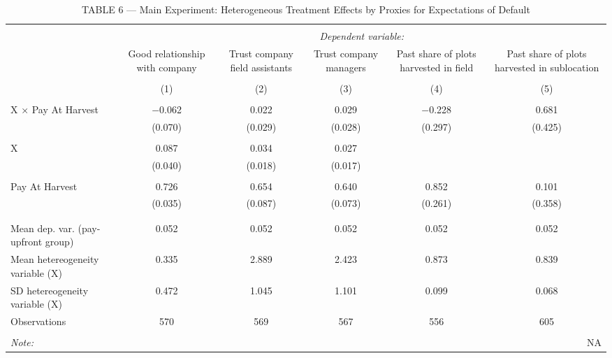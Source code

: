 
\begin{table}[!htbp] \centering 
  \caption{TABLE 6 — Main Experiment: Heterogeneous Treatment Effects by Proxies for Expectations of Default} 
  \label{} 
\begin{tabular}{@{\extracolsep{5pt}}lccccc} 
\\[-1.8ex]\hline 
\hline \\[-1.8ex] 
 & \multicolumn{5}{c}{\textit{Dependent variable:}} \\ 
\cline{2-6} 
 & Good relationship with company & Trust company field assistants & Trust company managers & Past share of plots harvested in field & Past share of plots harvested in sublocation \\ 
\\[-1.8ex] & (1) & (2) & (3) & (4) & (5)\\ 
\hline \\[-1.8ex] 
 X × Pay At Harvest & $-$0.062 & 0.022 & 0.029 & $-$0.228 & 0.681 \\ 
  & (0.070) & (0.029) & (0.028) & (0.297) & (0.425) \\ 
  & & & & & \\ 
 X & 0.087 & 0.034 & 0.027 &  &  \\ 
  & (0.040) & (0.018) & (0.017) &  &  \\ 
  & & & & & \\ 
 Pay At Harvest & 0.726 & 0.654 & 0.640 & 0.852 & 0.101 \\ 
  & (0.035) & (0.087) & (0.073) & (0.261) & (0.358) \\ 
  & & & & & \\ 
\hline \\[-1.8ex] 
Mean dep. var. (pay-upfront group) & 0.052 & 0.052 & 0.052 & 0.052 & 0.052 \\ 
Mean hetereogeneity variable (X) & 0.335 & 2.889 & 2.423 & 0.873 & 0.839 \\ 
SD hetereogeneity variable (X) & 0.472 & 1.045 & 1.101 & 0.099 & 0.068 \\ 
Observations & 570 & 569 & 567 & 556 & 605 \\ 
\hline 
\hline \\[-1.8ex] 
\textit{Note:}  & \multicolumn{5}{r}{NA} \\ 
\end{tabular} 
\end{table} 
